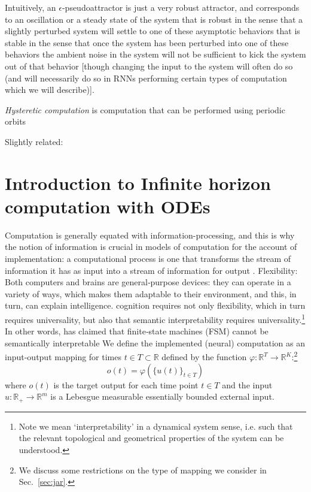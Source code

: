 \documentclass{scrartcl}
\theoremstyle{definition}
\theoremstyle{remark}
\newcommand{\reals}{\mathbb{R}}
\begin{document}
Intuitively, an $\epsilon$-pseudoattractor is just a very robust attractor, and corresponds to an oscillation or a steady state of the system that is robust in the sense that a slightly perturbed system will settle to one of these asymptotic behaviors that is stable in the sense that once the system has been perturbed into one of these behaviors the ambient noise in the system will not be sufficient to kick the system out of that behavior [though changing the input to the system will often do so (and will necessarily do so in RNNs performing certain types of computation which we will describe)].




\emph{Hysteretic computation} is computation that can be performed using periodic orbits



Slightly related: 
\citep{cotteret2024}
\citep{oliva2019}

\newpage
\section{Introduction to Infinite horizon computation with ODEs}	
Computation is generally equated with information-processing, and this is why the notion of information is crucial in models of computation for the account of implementation: a computational process is one that transforms the stream of information it has as input into a stream of information for output \citep{milkowski2014}.
Flexibility: Both computers and brains are general‑purpose devices: they can operate in a variety of ways, which makes them adaptable to their environment, and this, in turn, can explain intelligence. \citep{milkowski2018computermetaphor}
cognition requires not only flexibility, which in turn requires universality, but also that semantic interpretability requires universality.\footnote{Note we mean ‘interpretability’ in a dynamical system sense, i.e. such that the relevant topological and geometrical properties of the system can be understood.}
 In other words, \citep{pylyshyn1984} has claimed that finite‑state machines (FSM) cannot be semantically interpretable
We define the implemented (neural) computation as an input-output mapping for times $t\in T\subset\reals$ defined by the function $\varphi:\reals^T\rightarrow\reals^K$:\footnote{We discuss some restrictions on the type of mapping we consider in Sec.~\ref{sec:jar}.}
\begin{equation}
o(t) = \varphi(\{u(t)\}_{t\in T})
\end{equation}
where $o(t)$ is the target output for each time point $t\in T$ and the input  $u:\reals_{+}\to \reals^{m}$  is a Lebesgue measurable essentially bounded external input.
\end{document}
